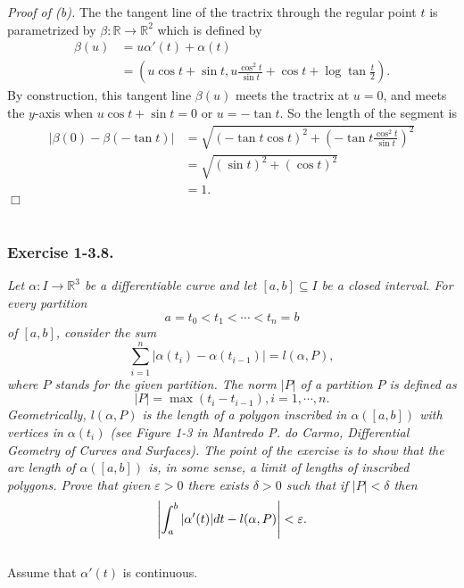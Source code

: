 \documentclass{article}
\begin{document}
\emph{Proof of (b).}
The the tangent line of the tractrix through the regular point $t$
is parametrized by $\beta: \mathbb{R} \to \mathbb{R}^2$ which is defined by
\begin{align*}
  \beta(u)
  &= u\alpha'(t) + \alpha(t) \\
  &= \left( u \cos t + \sin t, u \frac{\cos^2 t}{\sin t} + \cos t + \log\tan\frac{t}{2} \right).
\end{align*}
By construction, this tangent line $\beta(u)$ meets the tractrix at $u = 0$,
and meets the $y$-axis when $u \cos t + \sin t = 0$ or $u = -\tan t$.
So the length of the segment is
\begin{align*}
  |\beta(0) - \beta(-\tan t)|
  &= \sqrt{(-\tan t \cos t)^2+ \left( -\tan t \frac{\cos^2 t}{\sin t} \right)^2} \\
  &= \sqrt{(\sin t)^2+ (\cos t)^2} \\
  &= 1.
\end{align*}
$\Box$ \\\\






\subsubsection*{Exercise 1-3.8.}
\emph{Let $\alpha: I \to \mathbb{R}^3$ be a differentiable curve and
let $[a,b] \subseteq I$ be a closed interval.
For every partition
\[
  a = t_0 < t_1 < \cdots < t_n = b
\]
of $[a,b]$, consider the sum
\[
  \sum_{i=1}^{n} |\alpha(t_i) - \alpha(t_{i-1})| = l(\alpha,P),
\]
where $P$ stands for the given partition.
The norm $|P|$ of a partition $P$ is defined as
\[
  |P| = \max(t_i - t_{i-1}), i = 1, \cdots, n.
\]
Geometrically, $l(\alpha,P)$ is the length of a polygon inscribed in $\alpha([a,b])$
with vertices in $\alpha(t_i)$
(see Figure 1-3 in Mantredo P. do Carmo, Differential Geometry of Curves and Surfaces).
The point of the exercise is to show that the arc length of $\alpha([a,b])$ is,
in some sense, a limit of lengths of inscribed polygons.
Prove that given $\varepsilon > 0$ there exists $\delta > 0$ such that
if $|P| < \delta$ then
\[
  \abs{ \int_{a}^{b} |\alpha'(t)|dt - l(\alpha,P) } < \varepsilon.
\]} \\

Assume that $\alpha'(t)$ is continuous. \\
\end{document}
